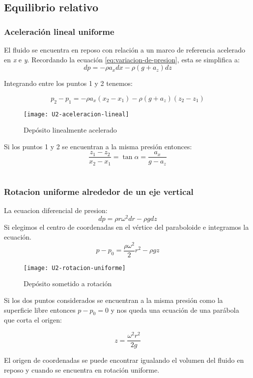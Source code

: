 \subsection{Equilibrio relativo}

\subsubsection{Aceleración lineal uniforme}	
El fluido se encuentra en reposo con relación a un marco de referencia acelerado en \emph{x} e \emph{y}. Recordando la ecuación \ref{eq:variacion-de-presion}, esta se simplifica a:
\begin{equation}
	dp = - \rho a_{x} dx - \rho(g + a_{z}) dz
\end{equation} 

Integrando entre los puntos 1 y 2 tenemos:

\begin{equation}
	p_{2}- p_{1} = - \rho a_{x}(x_{2}-x_{1}) - \rho(g + a_{z}) (z_{2}-z_{1})
\end{equation}
\begin{figure}[h]
	\centering
	\texttt{[image: U2-aceleracion-lineal]}
	\caption{Depósito linealmente acelerado}
\end{figure}

Si los puntos 1 y 2 se encuentran a la misma presión entonces:
\begin{equation}
	\dfrac{z_{1}-z_{2}}{x_{2}-x_{1}} = \tan \alpha = \dfrac{a_{x}}{g-a_{z}}
\end{equation}
\\
\subsubsection{Rotacion uniforme alrededor de un eje vertical}

La ecuacion diferencial de presion:
\begin{equation}
	dp = \rho r \omega^{2} dr - \rho g dz
\end{equation}
Si elegimos el centro de coordenadas en el vértice del paraboloide e integramos la ecuación.
\begin{equation}
	p -p_{0} = \dfrac{\rho \omega^{2} }{2} r^{2} - \rho g z
\end{equation}
\begin{figure}[h]
	\centering
	\texttt{[image: U2-rotacion-uniforme]}
	\caption{Depósito sometido a rotación}
\end{figure}
Si los dos puntos considerados se encuentran a la misma presión como la superficie libre entonces $p - p_{0} = 0$ y nos queda una ecuación de una parábola que corta el origen:

\begin{equation}
	z = \dfrac{\omega^{2} r^{2} }{2 g}
\end{equation}

El origen de coordenadas se puede encontrar igualando el volumen del fluido en reposo y cuando se encuentra en rotación uniforme.
